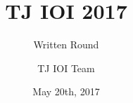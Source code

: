 \documentclass[a4paper,11pt]{scrartcl}
\begin{document}
\title{TJ IOI 2017}
\subtitle{Written Round}
\date{May 20th, 2017}

\author{TJ IOI Team}
\end{document}
